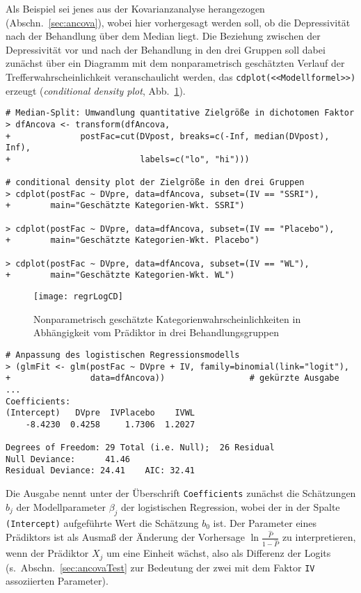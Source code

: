 Als Beispiel sei jenes aus der Kovarianzanalyse herangezogen (Abschn.\ \ref{sec:ancova}), wobei hier vorhergesagt werden soll, ob die Depressivität nach der Behandlung über dem Median liegt. Die Beziehung zwischen der Depressivität vor und nach der Behandlung in den drei Gruppen soll dabei zunächst über ein Diagramm mit dem nonparametrisch geschätzten Verlauf der Trefferwahrscheinlichkeit veranschaulicht werden, das \lstinline!cdplot(<<Modellformel>>)! erzeugt (\emph{conditional density plot}, Abb.\ \ref{fig:regrLogCD}).
\begin{lstlisting}
# Median-Split: Umwandlung quantitative Zielgröße in dichotomen Faktor
> dfAncova <- transform(dfAncova,
+              postFac=cut(DVpost, breaks=c(-Inf, median(DVpost), Inf),
+                          labels=c("lo", "hi")))

# conditional density plot der Zielgröße in den drei Gruppen
> cdplot(postFac ~ DVpre, data=dfAncova, subset=(IV == "SSRI"),
+        main="Geschätzte Kategorien-Wkt. SSRI")

> cdplot(postFac ~ DVpre, data=dfAncova, subset=(IV == "Placebo"),
+        main="Geschätzte Kategorien-Wkt. Placebo")

> cdplot(postFac ~ DVpre, data=dfAncova, subset=(IV == "WL"),
+        main="Geschätzte Kategorien-Wkt. WL")
\end{lstlisting}

\begin{figure}[ht]
\centering
\texttt{[image: regrLogCD]}
\vspace*{-1em}
\caption{Nonparametrisch geschätzte Kategorienwahrscheinlichkeiten in Abhängigkeit vom Prädiktor in drei Behandlungsgruppen}
\label{fig:regrLogCD}
\end{figure}

\begin{lstlisting}
# Anpassung des logistischen Regressionsmodells
> (glmFit <- glm(postFac ~ DVpre + IV, family=binomial(link="logit"),
+                data=dfAncova))                 # gekürzte Ausgabe ...
Coefficients:
(Intercept)   DVpre  IVPlacebo    IVWL
    -8.4230  0.4258     1.7306  1.2027

Degrees of Freedom: 29 Total (i.e. Null);  26 Residual
Null Deviance:	    41.46
Residual Deviance: 24.41 	AIC: 32.41
\end{lstlisting}

Die Ausgabe nennt unter der Überschrift \lstinline!Coefficients! zunächst die Schätzungen $b_{j}$ der Modellparameter $\beta_{j}$ der logistischen Regression, wobei der in der Spalte \lstinline!(Intercept)! aufgeführte Wert die Schätzung $b_{0}$ ist. Der Parameter eines Prädiktors ist als Ausmaß der Änderung der Vorhersage $\ln \frac{\hat{P}}{1-\hat{P}}$ zu interpretieren, wenn der Prädiktor $X_{j}$ um eine Einheit wächst, also als Differenz der Logits (s.\ Abschn.\ \ref{sec:ancovaTest} zur Bedeutung der zwei mit dem Faktor \lstinline!IV! assoziierten Parameter).

